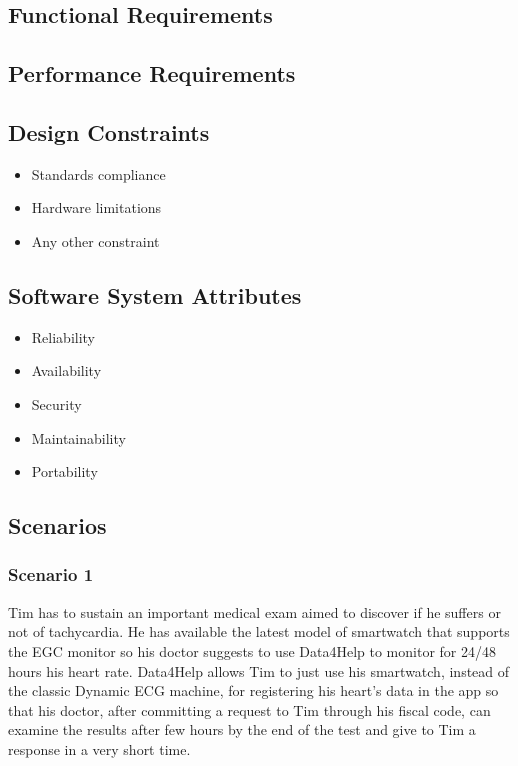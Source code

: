 \documentclass{article}
\begin{document}
\subsection{Functional Requirements}	

\subsection{Performance Requirements}
\subsection{Design Constraints}
		\begin{itemize}
			\item Standards compliance
			\item Hardware limitations
			\item Any other constraint
		\end{itemize}
\subsection{Software System Attributes}	
		\begin{itemize}
			\item Reliability
			\item Availability
			\item Security
			\item Maintainability
			\item Portability
		\end{itemize}
		
\subsection{Scenarios}

\subsubsection{Scenario 1}
Tim has to sustain an important medical exam aimed to discover if he
suffers or not of tachycardia. He has available the latest model of 
smartwatch that supports the EGC monitor so his doctor suggests to 
use Data4Help to monitor for 24/48 hours his heart rate. Data4Help 
allows Tim to just use his smartwatch, instead of the classic Dynamic 
ECG machine, for registering his heart’s data in the app so that his
doctor, after committing a request to Tim through his fiscal code, 
can examine the results after few hours by the end of the test and 
give to Tim a response in a very short time. 
\end{document}
